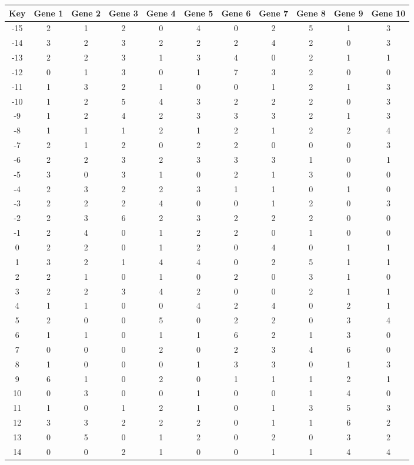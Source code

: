 \begin{tabular}{|c|c|c|c|c|c|c|c|c|c|c|}
\hline
Key & Gene 1 & Gene 2 & Gene 3 & Gene 4 & Gene 5 & Gene 6 & Gene 7 & Gene 8 & Gene 9 & Gene 10 \\
\hline
-15 & 2 & 1 & 2 & 0 & 4 & 0 & 2 & 5 & 1 & 3 \\
-14 & 3 & 2 & 3 & 2 & 2 & 2 & 4 & 2 & 0 & 3 \\
-13 & 2 & 2 & 3 & 1 & 3 & 4 & 0 & 2 & 1 & 1 \\
-12 & 0 & 1 & 3 & 0 & 1 & 7 & 3 & 2 & 0 & 0 \\
-11 & 1 & 3 & 2 & 1 & 0 & 0 & 1 & 2 & 1 & 3 \\
-10 & 1 & 2 & 5 & 4 & 3 & 2 & 2 & 2 & 0 & 3 \\
-9 & 1 & 2 & 4 & 2 & 3 & 3 & 3 & 2 & 1 & 3 \\
-8 & 1 & 1 & 1 & 2 & 1 & 2 & 1 & 2 & 2 & 4 \\
-7 & 2 & 1 & 2 & 0 & 2 & 2 & 0 & 0 & 0 & 3 \\
-6 & 2 & 2 & 3 & 2 & 3 & 3 & 3 & 1 & 0 & 1 \\
-5 & 3 & 0 & 3 & 1 & 0 & 2 & 1 & 3 & 0 & 0 \\
-4 & 2 & 3 & 2 & 2 & 3 & 1 & 1 & 0 & 1 & 0 \\
-3 & 2 & 2 & 2 & 4 & 0 & 0 & 1 & 2 & 0 & 3 \\
-2 & 2 & 3 & 6 & 2 & 3 & 2 & 2 & 2 & 0 & 0 \\
-1 & 2 & 4 & 0 & 1 & 2 & 2 & 0 & 1 & 0 & 0 \\
0 & 2 & 2 & 0 & 1 & 2 & 0 & 4 & 0 & 1 & 1 \\
1 & 3 & 2 & 1 & 4 & 4 & 0 & 2 & 5 & 1 & 1 \\
2 & 2 & 1 & 0 & 1 & 0 & 2 & 0 & 3 & 1 & 0 \\
3 & 2 & 2 & 3 & 4 & 2 & 0 & 0 & 2 & 1 & 1 \\
4 & 1 & 1 & 0 & 0 & 4 & 2 & 4 & 0 & 2 & 1 \\
5 & 2 & 0 & 0 & 5 & 0 & 2 & 2 & 0 & 3 & 4 \\
6 & 1 & 1 & 0 & 1 & 1 & 6 & 2 & 1 & 3 & 0 \\
7 & 0 & 0 & 0 & 2 & 0 & 2 & 3 & 4 & 6 & 0 \\
8 & 1 & 0 & 0 & 0 & 1 & 3 & 3 & 0 & 1 & 3 \\
9 & 6 & 1 & 0 & 2 & 0 & 1 & 1 & 1 & 2 & 1 \\
10 & 0 & 3 & 0 & 0 & 1 & 0 & 0 & 1 & 4 & 0 \\
11 & 1 & 0 & 1 & 2 & 1 & 0 & 1 & 3 & 5 & 3 \\
12 & 3 & 3 & 2 & 2 & 2 & 0 & 1 & 1 & 6 & 2 \\
13 & 0 & 5 & 0 & 1 & 2 & 0 & 2 & 0 & 3 & 2 \\
14 & 0 & 0 & 2 & 1 & 0 & 0 & 1 & 1 & 4 & 4 \\
\hline
\end{tabular}
